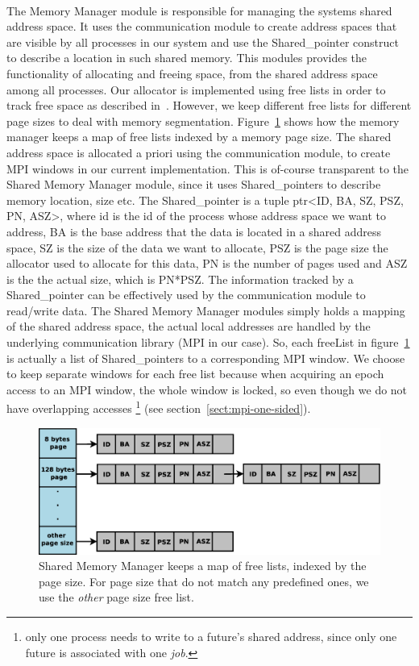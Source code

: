 \paragraph{}
The Memory Manager module is responsible for managing the systems shared address space. 
It uses the communication module to create address spaces that
are visible by all processes in our system and use the Shared\_pointer construct to describe a location in such
shared memory.  This modules provides the functionality of allocating and freeing space, from the shared address 
space among all processes.  Our allocator is implemented using free lists in order to track free space as 
described in~\cite[p.~185-187]{Tanenbaum:2007:MOS:1410217}.  
However, we keep different free lists for different page sizes to deal
with memory segmentation. Figure~\ref{fig:freeLists} shows how the memory manager keeps a map of free lists
indexed by a memory page size.
The shared address space is allocated a priori
using the communication module, to create MPI windows in our current implementation.  This is of-course transparent to
the Shared Memory Manager module, since it uses Shared\_pointers to describe memory location, size etc.  
The Shared\_pointer is a tuple  ptr<ID, BA, SZ, PSZ, PN, ASZ>, where id is the id of the process
whose address space we want to address, BA is the base address that the data is located in a shared address space,
SZ is the size of the data we want to allocate, PSZ is the page size the allocator used to allocate for this data,
PN is the number of pages used and ASZ is the the actual size, which is PN*PSZ.  The information tracked by a 
Shared\_pointer can be effectively used by the communication module to read/write data.  The Shared Memory Manager
modules simply holds a mapping of the shared address space, the actual local addresses are handled by the 
underlying communication library (MPI in our case).   
So, each freeList in figure~\ref{fig:freeLists} is actually a list of 
Shared\_pointers to a corresponding MPI window.  We choose
to keep separate windows for each free list because when acquiring an epoch access to an MPI window, the whole 
window is locked, so even though we do not have overlapping accesses \footnote{only one process needs to write to a 
future's shared address, since only one future is associated with one \emph{job}.} 
(see section~\ref{sect:mpi-one-sided}).  

\begin{figure}[!ht]
\includegraphics[width=\columnwidth]{figures/free_lists}
\caption{Shared Memory Manager keeps a map of free lists, indexed by the page size.  For page size that do
not match any predefined ones, we use the \emph{other} page size free list.}
\label{fig:freeLists}
\end{figure}

